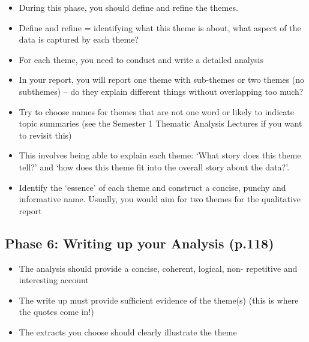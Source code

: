 \documentclass[
  english,
  letterpaper,
  DIV=11,
  numbers=noendperiod]{scrreprt}
\providecommand{\tightlist}{%
  \setlength{\itemsep}{0pt}\setlength{\parskip}{0pt}}
\begin{document}
\begin{itemize}
\tightlist
\item
  During this phase, you should define and refine the themes.
\item
  Define and refine = identifying what this theme is about, what aspect
  of the data is captured by each theme?
\item
  For each theme, you need to conduct and write a detailed analysis
\item
  In your report, you will report one theme with sub-themes or two
  themes (no subthemes) -- do they explain different things without
  overlapping too much?
\item
  Try to choose names for themes that are not one word or likely to
  indicate topic summaries (see the Semester 1 Thematic Analysis
  Lectures if you want to revisit this)
\end{itemize}

\begin{tcolorbox}[enhanced jigsaw, breakable, bottomtitle=1mm, leftrule=.75mm, opacityback=0, colbacktitle=quarto-callout-warning-color!10!white, opacitybacktitle=0.6, toprule=.15mm, colback=white, left=2mm, coltitle=black, bottomrule=.15mm, titlerule=0mm, title={Practical Steps}, toptitle=1mm, colframe=quarto-callout-warning-color-frame, arc=.35mm, rightrule=.15mm]

\begin{itemize}
\tightlist
\item
  This involves being able to explain each theme: `What story does this
  theme tell?' and `how does this theme fit into the overall story about
  the data?'.
\item
  Identify the `essence' of each theme and construct a concise, punchy
  and informative name. Usually, you would aim for two themes for the
  qualitative report
\end{itemize}

\end{tcolorbox}

\subsection{Phase 6: Writing up your Analysis
(p.118)}\label{phase-6-writing-up-your-analysis-p.118}

\begin{itemize}
\tightlist
\item
  The analysis should provide a concise, coherent, logical, non-
  repetitive and interesting account
\item
  The write up must provide sufficient evidence of the theme(s) (this is
  where the quotes come in!)
\item
  The extracts you choose should clearly illustrate the theme
\end{itemize}
\end{document}

